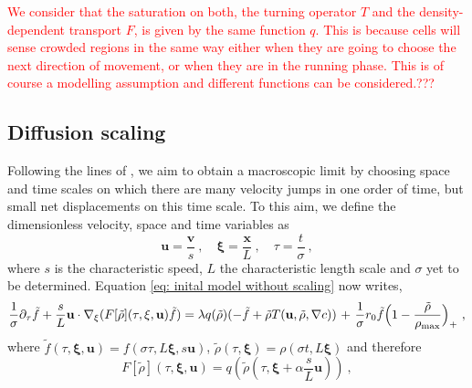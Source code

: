 \documentclass[review,onefignum,onetabnum]{siamart220329}
\begin{document}
\textcolor{red}{We consider that the saturation on both, the turning operator $T$ and the density-dependent transport $F$, is given by the same function $q$. This is because cells will sense crowded regions in the same way either when they are going to choose the next direction of movement, or when they are in the running phase. This is of course a modelling assumption and different functions can be considered.???}
\subsection{Diffusion scaling} Following the lines of \cite{Hillen2009}, we aim to obtain a macroscopic limit by choosing space and time scales on which {there are many velocity jumps in one order of time, but small net displacements on this time scale}. To this aim, we define the dimensionless velocity, space and time variables as
$$
\mathbf{u} = \frac{\mathbf{v}}{s}\ , \quad \mathbf{\xi} = \frac{\mathbf{x}}{L}\ , \quad \tau = \frac{t}{\sigma}\ ,
$$
\noindent where $s$ is the characteristic speed, $L$ the characteristic length scale and $\sigma$ yet to be determined. Equation \cref{eq: inital model without scaling} now writes,
\begin{equation}
    {{\frac{1}{\sigma}}} \partial_\tau \tilde{f}+ \frac{s}{L} \mathbf{u} \cdot \nabla_\xi (F[\tilde{\rho}](\tau,\mathbf{\xi},\mathbf{u}) \tilde{f})= \lambda q(\tilde{\rho})(-\tilde{f}+\tilde{\rho} T(\mathbf{u},\tilde{\rho},\nabla c)){\ +\ \frac{1}{\sigma} r_0\tilde{f}\Bigl(1-\frac{\tilde{\rho}}{\rho_{\textnormal{max}}} \Bigr)_+}\ ,\label{eq: scaled model}
\end{equation}
\noindent where {{$\tilde{f}(\tau,\mathbf{\xi},\mathbf{u}) = f(\sigma \tau,L \mathbf{\xi} ,s \mathbf{u})$}}, $\tilde{\rho}(\tau,\mathbf{\xi}) = \rho(\sigma t,L \mathbf{\xi})$ and therefore 
$$
F[\tilde{\rho}](\tau,\mathbf{\xi},\mathbf{u}) = {{q(\tilde{\rho}(\tau, \mathbf{\xi} + \alpha \frac{s}{L} \mathbf{u}))}}\ ,
$$
\end{document}
